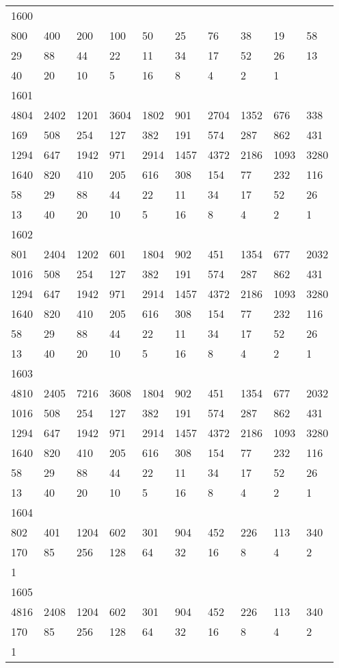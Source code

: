\begin{longtable}{*{10}{l}}
1600&&&&&&&&&\\
800& 400& 200& 100& 50& 25& 76& 38& 19& 58\\
29& 88& 44& 22& 11& 34& 17& 52& 26& 13\\
40& 20& 10& 5& 16& 8& 4& 2& 1& \\

1601&&&&&&&&&\\
4804& 2402& 1201& 3604& 1802& 901& 2704& 1352& 676& 338\\
169& 508& 254& 127& 382& 191& 574& 287& 862& 431\\
1294& 647& 1942& 971& 2914& 1457& 4372& 2186& 1093& 3280\\
1640& 820& 410& 205& 616& 308& 154& 77& 232& 116\\
58& 29& 88& 44& 22& 11& 34& 17& 52& 26\\
13& 40& 20& 10& 5& 16& 8& 4& 2& 1\\

1602&&&&&&&&&\\
801& 2404& 1202& 601& 1804& 902& 451& 1354& 677& 2032\\
1016& 508& 254& 127& 382& 191& 574& 287& 862& 431\\
1294& 647& 1942& 971& 2914& 1457& 4372& 2186& 1093& 3280\\
1640& 820& 410& 205& 616& 308& 154& 77& 232& 116\\
58& 29& 88& 44& 22& 11& 34& 17& 52& 26\\
13& 40& 20& 10& 5& 16& 8& 4& 2& 1\\

1603&&&&&&&&&\\
4810& 2405& 7216& 3608& 1804& 902& 451& 1354& 677& 2032\\
1016& 508& 254& 127& 382& 191& 574& 287& 862& 431\\
1294& 647& 1942& 971& 2914& 1457& 4372& 2186& 1093& 3280\\
1640& 820& 410& 205& 616& 308& 154& 77& 232& 116\\
58& 29& 88& 44& 22& 11& 34& 17& 52& 26\\
13& 40& 20& 10& 5& 16& 8& 4& 2& 1\\

1604&&&&&&&&&\\
802& 401& 1204& 602& 301& 904& 452& 226& 113& 340\\
170& 85& 256& 128& 64& 32& 16& 8& 4& 2\\
1& \\

1605&&&&&&&&&\\
4816& 2408& 1204& 602& 301& 904& 452& 226& 113& 340\\
170& 85& 256& 128& 64& 32& 16& 8& 4& 2\\
1& \\


\end{longtable}

